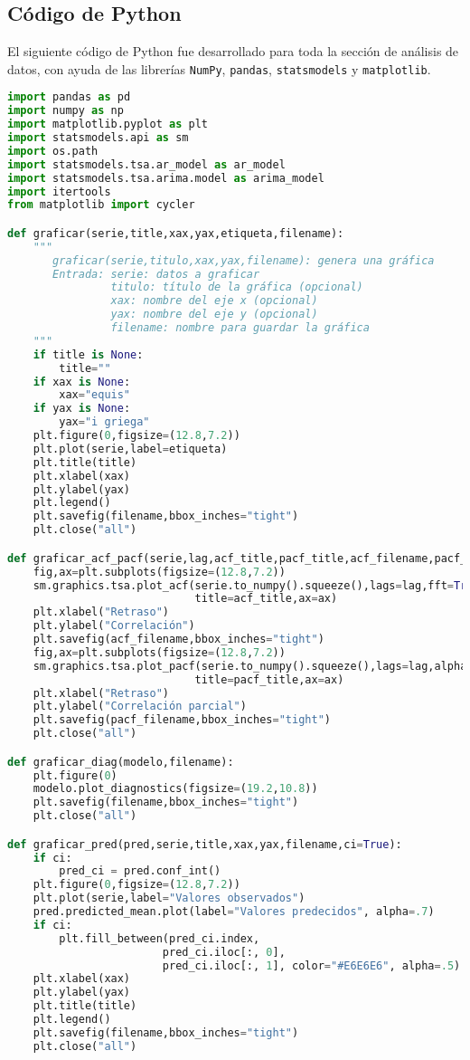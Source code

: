 \documentclass[11pt,letterpaper]{article}
\theoremstyle{definition}
\theoremstyle{theorem}
\theoremstyle{remark}
\begin{document}
	\begin{appendices}
		\section{Código de Python}
		\noindent El siguiente código de Python fue desarrollado para toda la sección de análisis de datos, con ayuda de las librerías \verb|NumPy|, \verb|pandas|, \verb|statsmodels| y \verb|matplotlib|.
		\begin{lstlisting}[language=Python]
import pandas as pd
import numpy as np
import matplotlib.pyplot as plt
import statsmodels.api as sm
import os.path
import statsmodels.tsa.ar_model as ar_model
import statsmodels.tsa.arima.model as arima_model
import itertools
from matplotlib import cycler

def graficar(serie,title,xax,yax,etiqueta,filename):
    """
       graficar(serie,titulo,xax,yax,filename): genera una gráfica
       Entrada: serie: datos a graficar
                titulo: título de la gráfica (opcional)
                xax: nombre del eje x (opcional)
                yax: nombre del eje y (opcional)
                filename: nombre para guardar la gráfica
    """
    if title is None:
        title=""
    if xax is None:
        xax="equis"
    if yax is None:
        yax="i griega"
    plt.figure(0,figsize=(12.8,7.2))
    plt.plot(serie,label=etiqueta)
    plt.title(title)
    plt.xlabel(xax)
    plt.ylabel(yax)
    plt.legend()
    plt.savefig(filename,bbox_inches="tight")
    plt.close("all")

def graficar_acf_pacf(serie,lag,acf_title,pacf_title,acf_filename,pacf_filename):
    fig,ax=plt.subplots(figsize=(12.8,7.2))
    sm.graphics.tsa.plot_acf(serie.to_numpy().squeeze(),lags=lag,fft=True,alpha=.05,
                             title=acf_title,ax=ax)
    plt.xlabel("Retraso")
    plt.ylabel("Correlación")
    plt.savefig(acf_filename,bbox_inches="tight")
    fig,ax=plt.subplots(figsize=(12.8,7.2))
    sm.graphics.tsa.plot_pacf(serie.to_numpy().squeeze(),lags=lag,alpha=.05,method="ywm",
                             title=pacf_title,ax=ax)
    plt.xlabel("Retraso")
    plt.ylabel("Correlación parcial")
    plt.savefig(pacf_filename,bbox_inches="tight")
    plt.close("all")

def graficar_diag(modelo,filename):
    plt.figure(0)
    modelo.plot_diagnostics(figsize=(19.2,10.8))
    plt.savefig(filename,bbox_inches="tight")
    plt.close("all")

def graficar_pred(pred,serie,title,xax,yax,filename,ci=True):
    if ci:
        pred_ci = pred.conf_int()
    plt.figure(0,figsize=(12.8,7.2))
    plt.plot(serie,label="Valores observados")
    pred.predicted_mean.plot(label="Valores predecidos", alpha=.7)
    if ci:
        plt.fill_between(pred_ci.index,
                        pred_ci.iloc[:, 0],
                        pred_ci.iloc[:, 1], color="#E6E6E6", alpha=.5)
    plt.xlabel(xax)
    plt.ylabel(yax)
    plt.title(title)
    plt.legend()
    plt.savefig(filename,bbox_inches="tight")
    plt.close("all")


\end{lstlisting}
\end{appendices}
\end{document}
